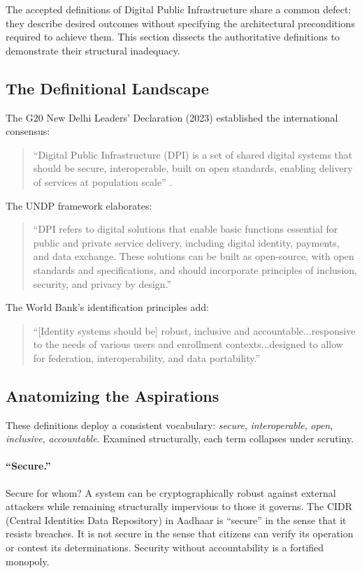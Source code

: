 \documentclass{article}
\begin{document}
The accepted definitions of Digital Public Infrastructure share a common defect: they describe desired outcomes without specifying the architectural preconditions required to achieve them. This section dissects the authoritative definitions to demonstrate their structural inadequacy.

\subsection{The Definitional Landscape}

The G20 New Delhi Leaders' Declaration (2023) established the international consensus:

\begin{quote}
``Digital Public Infrastructure (DPI) is a set of shared digital systems that should be secure, interoperable, built on open standards, enabling delivery of services at population scale'' \citep{g20}.
\end{quote}

The UNDP framework \citep{undp} elaborates:

\begin{quote}
``DPI refers to digital solutions that enable basic functions essential for public and private service delivery, including digital identity, payments, and data exchange. These solutions can be built as open-source, with open standards and specifications, and should incorporate principles of inclusion, security, and privacy by design.''
\end{quote}

The World Bank's identification principles add:

\begin{quote}
``[Identity systems should be] robust, inclusive and accountable...responsive to the needs of various users and enrollment contexts...designed to allow for federation, interoperability, and data portability.''
\end{quote}

\subsection{Anatomizing the Aspirations}

These definitions deploy a consistent vocabulary: \textit{secure}, \textit{interoperable}, \textit{open}, \textit{inclusive}, \textit{accountable}. Examined structurally, each term collapses under scrutiny.

\paragraph{``Secure.''}  Secure for whom? A system can be cryptographically robust against external attackers while remaining structurally impervious to those it governs. The CIDR (Central Identities Data Repository) in Aadhaar is ``secure'' in the sense that it resists breaches. It is not secure in the sense that citizens can verify its operation or contest its determinations. Security without accountability is a fortified monopoly.
\end{document}
